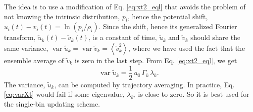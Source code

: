 \documentclass[reprint, superscriptaddress, floatfix]{revtex4-1}
\begin{document}
The idea is to use a modification
of Eq. \eqref{eq:xt2_eql}
that avoids the problem of not
knowing the intrinsic distribution, $p_i$,
hence the potential shift,
$u_i(t) - v_i(t) = \ln(p_i/\rho_i)$.
%
Since the shift,
hence its generalized Fourier transform,
$\tilde u_k(t) - \tilde v_k(t)$,
is a constant of time,
${\tilde u}_{k}$ and ${\tilde v}_{k}$
should share the same variance,
$\operatorname{var} {\tilde u}_{k} =
 \operatorname{var} {\tilde v}_{k} =
 \left\langle {\tilde v}_{k}^2 \right\rangle$,
where we have used the fact that
the ensemble average of ${\tilde v}_{k}$
is zero in the last step.
%
From Eq. \eqref{eq:xt2_eql}, we get
%
\begin{equation}
  \operatorname{var} {\tilde u}_k
  =
  \frac{1}{2} \,
  a_0 \, \Gamma_k \, \lambda_k
  .
\label{eq:varXt}
\end{equation}
%
The variance, $\tilde u_k$, can be computed
by trajectory averaging.
%
In practice, Eq. \eqref{eq:varXt}
would fail if some eigenvalue, $\lambda_k$, is close to zero.
So it is best used for the single-bin updating scheme.%
\end{document}
